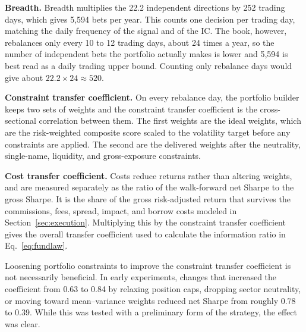 \documentclass[11pt]{article}
\begin{document}
\textbf{Breadth.} Breadth multiplies the 22.2 independent directions by 252 trading days, which gives 5,594 bets per year. This counts one decision per trading day, matching the daily frequency of the signal and of the IC. The book, however, rebalances only every 10 to 12 trading days, about 24 times a year, so the number of independent bets the portfolio actually makes is lower and 5,594 is best read as a daily trading upper bound. Counting only rebalance days would give about $22.2\times24\approx520$.

\textbf{Constraint transfer coefficient.} 
On every rebalance day, the portfolio builder keeps two sets of weights and the constraint transfer coefficient is the cross-sectional correlation between them. The first weights are the ideal weights, which are the risk-weighted composite score scaled to the volatility target before any constraints are applied. The second are the delivered weights after the neutrality, single-name, liquidity, and gross-exposure constraints.

\textbf{Cost transfer coefficient.} Costs reduce returns rather than altering weights, and are measured separately as the ratio of the walk-forward net Sharpe to the gross Sharpe. It is the share of the gross risk-adjusted return that survives the commissions, fees, spread, impact, and borrow costs modeled in Section~\ref{sec:execution}. Multiplying this by the constraint transfer coefficient gives the overall transfer coefficient used to calculate the information ratio in Eq.~\ref{eq:fundlaw}.

Loosening portfolio constraints to improve the constraint transfer coefficient is not necessarily beneficial. In early experiments, changes that increased the coefficient from 0.63 to 0.84 by relaxing position caps, dropping sector neutrality, or moving toward mean--variance weights reduced net Sharpe from roughly 0.78 to 0.39. While this was tested with a preliminary form of the strategy, the effect was clear.
\end{document}
